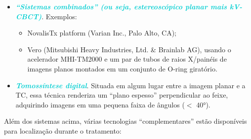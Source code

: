 \documentclass[11pt,a4paper]{article}
\begin{document}
\begin{itemize}[label=\textcolor{CarnationPink}{$\blacktriangleright$}]
        \item \textcolor{DarkTurquoise}{\textbf{\textit{“Sistemas combinados” (ou seja, estereoscópico planar mais kV-CBCT)}}}. Exemplos:
        \begin{itemize}[label=\textcolor{CarnationPink}{$\star$}]
            \item NovalisTx platform (Varian Inc., Palo Alto, CA);
            \item  Vero (Mitsubishi Heavy Industries, Ltd. \& Brainlab AG), usando o acelerador MHI-TM2000 e um par de tubos de raios X/painéis de imagens planos montados em um conjunto de O-ring giratório.
        \end{itemize}

        \item \textcolor{DarkTurquoise}{\textbf{\textit{Tomossíntese digital}}}. Situada em algum lugar entre a imagem planar e a TC, essa técnica renderiza um “plano espesso” perpendicular ao feixe, adquirindo imagens em uma pequena faixa de ângulos ($<$ \ang{40}).
    \end{itemize}

    Além dos sistemas acima, várias tecnologias “complementares” estão disponíveis para localização durante o tratamento:
    
\end{document}
